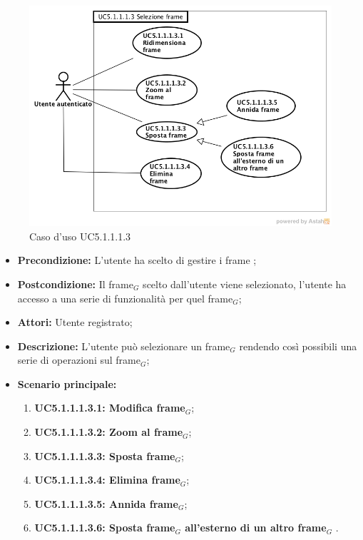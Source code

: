 \begin{figure}[h]
	\begin{center}
	\includegraphics[scale=0.4]{diagram/UC5-1-1-1-3.png}
	\caption{Caso d'uso UC5.1.1.1.3}
	\end{center}
\end{figure}
\begin{itemize}
	\item \textbf{Precondizione:} L'utente ha scelto di gestire i frame ;
	\item \textbf{Postcondizione:} Il frame$_G$ scelto dall'utente viene selezionato, l'utente ha accesso a una serie di funzionalità per quel frame$_G$;
	\item \textbf{Attori:} Utente registrato;
	\item \textbf{Descrizione:} L'utente può selezionare un frame$_G$ rendendo così possibili una serie di operazioni sul frame$_G$;
	\item \textbf{Scenario principale:}
	\begin{enumerate}
		\item \textbf{ UC5.1.1.1.3.1: Modifica frame$_G$};
		\item \textbf{ UC5.1.1.1.3.2: Zoom al frame$_G$};
		\item \textbf{ UC5.1.1.1.3.3: Sposta frame$_G$};
		\item \textbf{ UC5.1.1.1.3.4: Elimina frame$_G$};
		\item \textbf{ UC5.1.1.1.3.5: Annida frame$_G$};
		\item \textbf{ UC5.1.1.1.3.6: Sposta frame$_G$ all'esterno di un altro frame$_G$  }.
	\end{enumerate}
\end{itemize}
